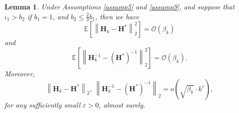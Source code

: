 \documentclass[aos]{imsart}
\numberwithin{equation}{section}
\theoremstyle{plain}
\newtheorem{lemma}{Lemma}
\begin{document}
\begin{appendix}
\begin{lemma}
\label{lemma29}
Under Assumptions \ref{assump5} and  \ref{assump9}, and suppose that $\iota_1>b_2$ if $b_1=1$, and $b_2 \leq \frac{2}{3}b_1$, then we have
    \begin{equation}
        \mathbb{E} \left[ \left\| \bm{H}_k - \bm{H}^{*}\right\|_2^2 \right] = \mathcal{O} \left( \beta_k \right)
    \end{equation}
    and 
     \begin{equation}
        \mathbb{E} \left[ \left\| \bm{H}_k^{-1} - \left(\bm{H}^{*}\right)^{-1}\right\|_2^2 \right] = \mathcal{O} \left( \beta_k \right).
    \end{equation}
    Moreover, 
    \begin{equation*}
        \left\| \bm{H}_k - \bm{H}^{*}\right\|_2,~\left\| \bm{H}_k^{-1} - \left(\bm{H}^{*}\right)^{-1}\right\|_2 = o\left(\sqrt{\beta_k} \cdot k^{\varepsilon}  \right),
    \end{equation*}
    for any sufficiently small $\varepsilon > 0$, almost surely.
\end{lemma}



\end{appendix}
\end{document}

